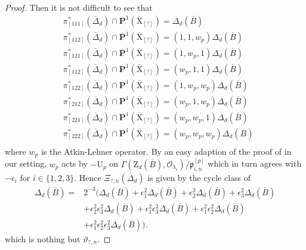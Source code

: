 \documentclass[10pt]{amsart}
\numberwithin{equation}{section}
\theoremstyle{plain}
\numberwithin{equation}{section}
\theoremstyle{definition}
\theoremstyle{remark}
\def\calO{\mathcal{O}}
\def\frakp{\mathfrak{p}}
\def\PP{\mathbf{P}}
\def\rmX{\mathrm{X}}
\def\rmXbar{\overline{\rmX}}
\def\rmU{\mathrm{U}}
\def\rmZ{\mathrm{Z}}
\begin{document}
\begin{proof}
Then it is not difficult to see that
\begin{equation*}
\begin{aligned}
&\pi^{\ast}_{[111]}(\overline{\Delta}_{d})\cap \PP^{1}(\rmXbar_{[?]})=\Delta_{d}(\overline{B})\\
&\pi^{\ast}_{[112]}(\overline{\Delta}_{d})\cap \PP^{1}(\rmXbar_{[?]})=(1,1, w_{p})\Delta_{d}(\overline{B})\\
&\pi^{\ast}_{[121]}(\overline{\Delta}_{d})\cap\PP^{1}(\rmXbar_{[?]})=(1, w_{p}, 1)\Delta_{d}(\overline{B})\\
&\pi^{\ast}_{[112]}(\overline{\Delta}_{d})\cap \PP^{1}(\rmXbar_{[?]})=(w_{p}, 1, 1)\Delta_{d}(\overline{B})\\
&\pi^{\ast}_{[122]}(\overline{\Delta}_{d})\cap \PP^{1}(\rmXbar_{[?]})=(1, w_{p}, w_{p})\Delta_{d}(\overline{B})\\
&\pi^{\ast}_{[212]}(\overline{\Delta}_{d})\cap \PP^{1}(\rmXbar_{[?]})=(w_{p}, 1, w_{p})\Delta_{d}(\overline{B})\\
&\pi^{\ast}_{[221]}(\overline{\Delta}_{d})\cap \PP^{1}(\rmXbar_{[?]})=(w_{p},  w_{p}, 1)\Delta_{d}(\overline{B})\\
&\pi^{\ast}_{[222]}(\overline{\Delta}_{d})\cap \PP^{1}(\rmXbar_{[?]})= (w_{p},  w_{p}, w_{p})\Delta_{d}(\overline{B})\\
\end{aligned}
\end{equation*}
where $w_{p}$ is the Atkin-Lehner operator. By an easy adaption of the proof of \cite[Proposition 3.8]{Ri-100} in our setting, $w_{p}$ acts by $-\rmU_{p}$ on $\Gamma(\rmZ_{d}(\overline{B}), \calO_{\lambda_{i}})/\frakp^{[p]}_{i,n}$ which in turn agrees with $-\epsilon_{i}$ for $i\in\{1, 2, 3\}$. Hence $\Xi_{?, n}(\overline{\Delta}_{d})$ is given by the cycle class of 
\begin{equation*}
\begin{aligned}
\Delta_{d}(\overline{B})=&2^{-3}(\Delta_{d}(\overline{B})+\epsilon^{2}_{1}\Delta_{d}(\overline{B})+\epsilon^{2}_{2}\Delta_{d}(\overline{B})+\epsilon^{2}_{3}\Delta_{d}(\overline{B})\\
&+\epsilon^{2}_{2}\epsilon^{2}_{3}\Delta_{d}(\overline{B})+\epsilon^{2}_{1}\epsilon^{2}_{3}\Delta_{d}(\overline{B})+\epsilon^{2}_{1}\epsilon^{2}_{2}\Delta_{d}(\overline{B})\\
&+\epsilon^{2}_{1}\epsilon^{2}_{2}\epsilon^{2}_{3}\Delta_{d}(\overline{B})).
\end{aligned}
\end{equation*}
which is nothing but $\vartheta_{?, n}$.
\end{proof}
\end{document}
